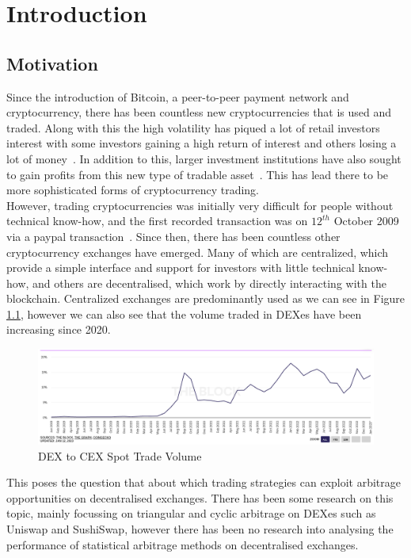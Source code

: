 \chapter{Introduction}
\section{Motivation}
Since the introduction of Bitcoin, a peer-to-peer payment network and cryptocurrency, there has been countless new cryptocurrencies that is used and traded. Along with this the high volatility has piqued a lot of retail investors interest with some investors gaining a high return of interest and others losing a lot of money~\cite{losing_money_on_crypto_2021}. In addition to this, larger investment institutions have also sought to gain profits from this new type of tradable asset~\cite{gondek_what_nodate}. This has lead there to be more sophisticated forms of cryptocurrency trading.
\\[5mm]
However, trading cryptocurrencies was initially very difficult for people without technical know-how, and the first recorded transaction was on $12^{th}$ October 2009 via a paypal transaction~\cite{noauthor_history_nodate}. Since then, there has been countless other cryptocurrency exchanges have emerged. Many of which are centralized, which provide a simple interface and support for investors with little technical know-how, and others are decentralised, which work by directly interacting with the blockchain. Centralized exchanges are predominantly used as we can see in Figure \ref{fig:dex_to_cex}, however we can also see that the volume traded in DEXes have been increasing since 2020. 

\begin{figure}[htb!]
    \centering
    \includegraphics[width=\textwidth]{introduction/Images/dex_to_cex.png}
    \caption{{DEX} to {CEX} {Spot} {Trade} {Volume}~\cite{dex_to_cex}}
    \label{fig:dex_to_cex}
\end{figure}

This poses the question that about which trading strategies can exploit arbitrage opportunities on decentralised exchanges. There has been some research on this topic, mainly focussing on triangular and cyclic arbitrage on DEXes such as Uniswap and SushiSwap, however there has been no research into analysing the performance of statistical arbitrage methods on decentralised exchanges.

